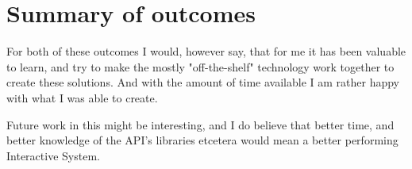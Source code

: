 \documentclass[11pt,fleqn]{book} %
\begin{document}
\section{Summary of outcomes}
For both of these outcomes I would, however say, that for me it has been valuable to learn, and try to make the mostly "off-the-shelf" technology work together to create these solutions. And with the amount of time available I am rather happy with what I was able to create.

Future work in this might be interesting, and I do believe that better time, and better knowledge of the API's libraries etcetera would mean a better performing Interactive System.

\printbibliography

\vfill
\end{document}
